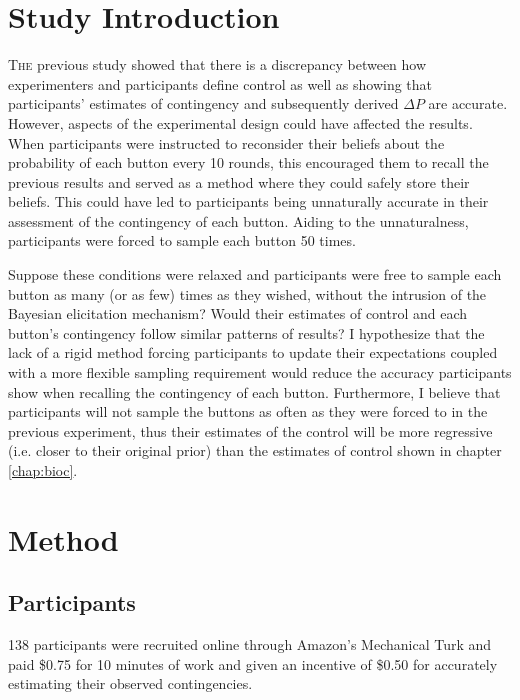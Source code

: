\documentclass[USenglish,letterpaper,12pt,extrafontsizes,oneside,onecolumn,final]{memoir}
\newcommand{\deltap}{$\Delta P$}
\begin{document}
\section{Study Introduction}
\lettrine[lines=2,slope=-3pt,nindent=2pt]{T}{he} previous study showed that there is a discrepancy between how experimenters and participants define control as well as showing that participants' estimates of contingency and subsequently derived \deltap \xspace are accurate.  However, aspects of the experimental design could have affected the results. When participants were instructed to reconsider their beliefs about the probability of each button every 10 rounds, this encouraged them to recall the previous results and served as a method where they could safely store their beliefs. This could have led to participants being unnaturally accurate in their assessment of the contingency of each button.  Aiding to the unnaturalness, participants were forced to sample each button 50 times.

Suppose these conditions were relaxed and participants were free to sample each button as many (or as few) times as they wished, without the intrusion of the Bayesian elicitation mechanism?  Would their estimates of control and each button's contingency follow similar patterns of results? I hypothesize that the lack of a rigid method forcing participants to update their expectations coupled with a more flexible sampling requirement would reduce the accuracy participants show when recalling the contingency of each button.  Furthermore, I believe that participants will not sample the buttons as often as they were forced to in the previous experiment, thus their estimates of the control will be more regressive (i.e. closer to their original prior) than the estimates of control shown in chapter \ref{chap:bioc}.  

\section{Method}

\subsection{Participants}
138 participants were recruited online through Amazon's Mechanical Turk and paid \$0.75 for 10 minutes of work and given an incentive of \$0.50 for accurately estimating their observed contingencies.
\end{document}
